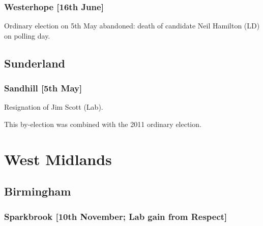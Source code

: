 \begin{resultsiii}

\subsubsection*{Westerhope \hspace*{\fill}\nolinebreak[1]%
\enspace\hspace*{\fill}
[16th June]}


Ordinary election on 5th May abandoned: death of candidate Neil Hamilton (LD) on polling day.


\subsection*{Sunderland}

\subsubsection*{Sandhill \hspace*{\fill}\nolinebreak[1]%
\enspace\hspace*{\fill}
[5th May]}


Resignation of Jim Scott (Lab).

This by-election was combined with the 2011 ordinary election.

\section{West Midlands}

\subsection*{Birmingham}

\subsubsection*{Sparkbrook \hspace*{\fill}\nolinebreak[1]%
\enspace\hspace*{\fill}
[10th November; Lab gain from Respect]}


\end{resultsiii}
